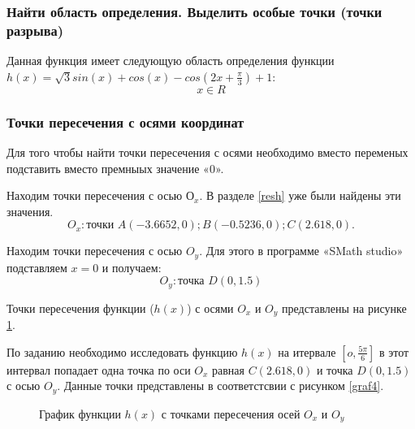 \documentclass[russian,utf8,nocolumnxxxi,nocolumnxxxii]{eskdtext}
\begin{document}
\subsubsection{Найти область определения. Выделить особые точки (точки разрыва)}

Данная функция имеет следующую область определения функции $ h(x)=\sqrt{3} sin(x)+cos(x)-cos(2x+\frac{\pi}{3})+1$: 
$$x\in R$$


\subsubsection{Точки пересечения с осями координат}

Для того чтобы найти точки пересечения с осями необходимо вместо переменых подставить вместо премныых значение «0».

Находим точки пересечения с осью $О_x$. В разделе \ref{resh}  уже были найдены эти значения. 
$$
O_x: \text{точки } A(-3.6652, 0);  B( -0.5236, 0); C(2.618, 0).
$$

Находим точки пересечения с осью $O_y$. Для этого в программе «SMath studio» подставляем $x=0$ и получаем:
$$
O_y: \text{точка } D (0, 1.5)
$$

Точки пересечения функции ($h(x)$) с осями $O_x$ и $O_y$ представлены на рисунке \ref{graf3}.

По заданию необходимо исследовать функцию $h(x)$ на итервале $[o, \frac{5\pi}{6}]$ \Rightarrow в этот интервал попадает одна точка по оси $O_x$ равная $C(2.618,0)$ и точка $D(0, 1.5)$ с осью $O_y$. Данные точки представлены в соответстсвии с рисунком \ref{graf4}.


 \begin{figure}[h!]
\begin{center}
\caption{График функции $h(x)$ с точками пересечения осей $O_x$ и $O_y$} \label{graf3}
\end{center}
\end{figure}
\end{document}
